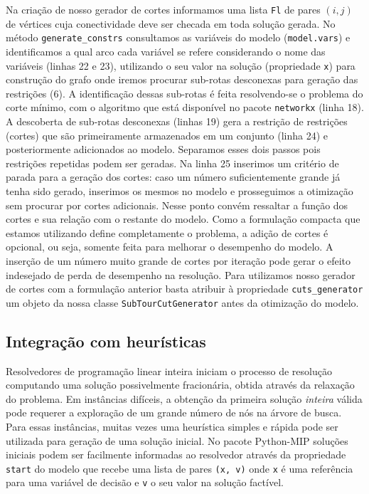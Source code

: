 \documentclass[a4paper,11pt,fleqn]{article}
\begin{document}
Na criação de nosso gerador de cortes informamos uma lista \texttt{Fl} de pares $(i,j)$ de vértices cuja conectividade deve ser checada em toda solução gerada. No método \texttt{generate\_constrs} consultamos as variáveis do modelo (\texttt{model.vars}) e identificamos a qual arco cada variável se refere considerando o nome das variáveis (linhas 22 e  23), utilizando o seu valor na solução (propriedade \texttt{x}) para construção do grafo onde iremos procurar sub-rotas desconexas para geração das restrições (6). A identificação dessas sub-rotas é feita resolvendo-se o problema do corte mínimo, com o algoritmo que está disponível no pacote \texttt{networkx} (linha 18). A descoberta de sub-rotas desconexas (linhas 19) gera a restrição de restrições (cortes) que são primeiramente armazenados em um conjunto (linha 24) e posteriormente adicionados ao modelo. Separamos esses dois passos pois restrições repetidas podem ser geradas. Na linha 25 inserimos um critério de parada para a geração dos cortes: caso um número suficientemente grande já tenha sido gerado, inserimos os mesmos no modelo e prosseguimos a otimização sem procurar por cortes adicionais. Nesse ponto convém ressaltar a função dos cortes e sua relação com o restante do modelo. Como a formulação compacta que estamos utilizando define completamente o problema, a adição de cortes é opcional, ou seja, somente feita para melhorar o desempenho do modelo. A inserção de um número muito grande de cortes por iteração pode gerar o efeito indesejado de perda de desempenho na resolução. Para utilizamos nosso gerador de cortes com a formulação anterior basta atribuir à propriedade \texttt{cuts\_generator} um objeto da nossa classe \texttt{SubTourCutGenerator} antes da otimização do modelo.

\subsection{Integração com heurísticas}

Resolvedores de programação linear inteira iniciam o processo de resolução computando uma solução possivelmente fracionária, obtida através da relaxação do problema. Em instâncias difíceis, a obtenção da primeira solução \emph{inteira} válida pode requerer a exploração de um grande número de nós na árvore de busca. Para essas instâncias, muitas vezes uma heurística simples e rápida pode ser utilizada para geração de uma solução inicial. No pacote Python-MIP soluções iniciais podem ser facilmente informadas ao resolvedor através da propriedade \texttt{start} do modelo que recebe uma lista de pares \texttt{(x, v)} onde \texttt{x} é uma referência para uma variável de decisão e \texttt{v} o seu valor na solução factível. 
\end{document}
